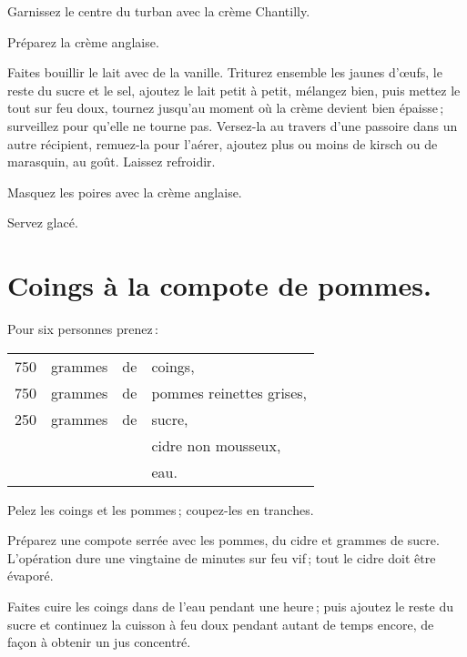 Garnissez le centre du turban avec la crème Chantilly.

Préparez la crème anglaise.

Faites bouillir le lait avec de la vanille. Triturez ensemble les jaunes
d'œufs, le reste du sucre et le sel, ajoutez le lait petit à petit, mélangez
bien, puis mettez le tout sur feu doux, tournez jusqu'au moment où la crème
devient bien épaisse ; surveillez pour qu'elle ne tourne pas. Versez-la au
travers d'une passoire dans un autre récipient, remuez-la pour l'aérer, ajoutez
plus ou moins de kirsch ou de marasquin, au goût. Laissez refroidir.

Masquez les poires avec la crème anglaise.

Servez glacé.

\section*{\centering Coings à la compote de pommes.}
{}

Pour six personnes prenez :

\footnotesize
\begin{longtable}{rrrp{16em}}
    750 & grammes & de & coings,                                                                          \\
    750 & grammes & de & pommes reinettes grises,                                                         \\
    250 & grammes & de & sucre,                                                                           \\
        &         &    & cidre non mousseux,                                                              \\
        &         &    & eau.                                                                             \\
\end{longtable}
\normalsize

Pelez les coings et les pommes ; coupez-les en tranches.

Préparez une compote serrée avec les pommes, du cidre et {\mmm} grammes
de sucre. L'opération dure une vingtaine de minutes sur feu vif ; tout le cidre
doit être évaporé.

Faites cuire les coings dans de l'eau pendant une heure ; puis ajoutez le reste
du sucre et continuez la cuisson à feu doux pendant autant de temps encore, de
façon à obtenir un jus concentré.

